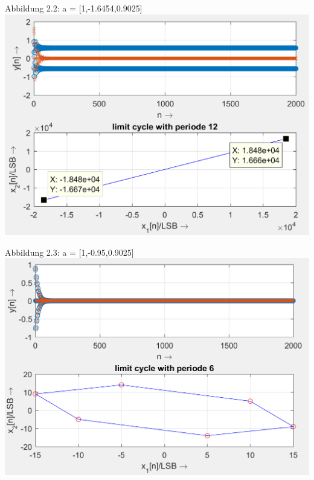 \begin{center}
Abbildung 2.2: a = [1,-1.6454,0.9025]\\
\includegraphics[scale=0.9]{../Tab3_2.PNG}
\end{center}

\newpage

\begin{center}
Abbildung 2.3: a = [1,-0.95,0.9025]\\
\includegraphics[scale=0.9]{../Tab3_3.PNG}
\end{center}

